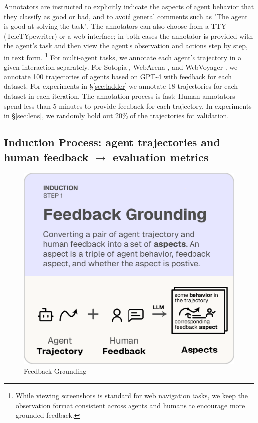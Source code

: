 Annotators are instructed to explicitly indicate the aspects of agent behavior that they classify as good or bad,
and to avoid general comments such as \textsf{"The agent is good at solving the task"}.
The annotators can also choose from a TTY (TeleTYpewriter) or a web interface; in both cases the annotator is provided with the agent's task
and then view the agent's observation and actions step by step, in text form. \footnote{While viewing screenshots is standard for web navigation tasks, we keep the observation format consistent across agents and humans to encourage more grounded feedback.}
For multi-agent tasks, we annotate each agent's trajectory in a given interaction separately. For Sotopia \citep{zhousotopia}, WebArena \citep{zhouwebarena},
and WebVoyager \citep{he2024webvoyager}, we annotate 100 trajectories of agents based on GPT-4 \citep{achiam2023gpt} with feedback for each dataset. For experiments in \S\ref{sec:ladder} we annotate 18 trajectories for each dataset in each
iteration. The annotation process is fast: Human annotators spend less than 5 minutes to provide feedback for each trajectory. In experiments in \S\ref{sec:lens}, we randomly hold out 20\% of the trajectories for validation.

\subsection{\texorpdfstring{Induction Process: agent trajectories and human feedback $\rightarrow$ evaluation metrics}{Induction Process: agent trajectories and human feedback -> evaluation metrics}}
\label{sec:induction_process}

\begin{figure}
  \vspace{-15pt}
  \includegraphics[width=\linewidth]{figs/autolibra_step_1.pdf}
  \vspace{-10pt}
  \caption{Feedback Grounding}
  \label{fig:feedback_grounding}
\end{figure}
